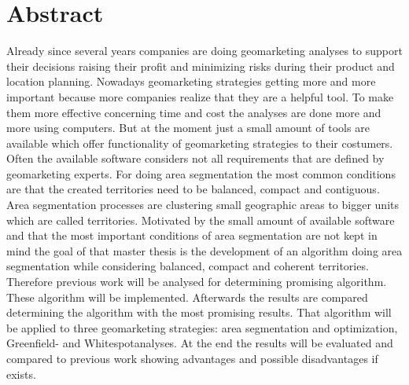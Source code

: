 \section*{Abstract}

Already since several years companies are doing geomarketing analyses to support their decisions raising their profit and minimizing risks during their product and location planning. Nowadays geomarketing strategies getting more and more important because more companies realize that they are a helpful tool. To make them more effective concerning time and cost the analyses are done more and more using computers. But at the moment just a small amount of tools are available which offer functionality of geomarketing strategies to their costumers. Often the available software considers not all requirements that are defined by geomarketing experts. For doing area segmentation the most common conditions are that the created territories need to be balanced, compact and contiguous. Area segmentation processes are clustering small geographic areas to bigger units which are called territories. Motivated by the small amount of available software and that the most important conditions of area segmentation are not kept in mind the goal of that master thesis is the development of an algorithm doing area segmentation while considering balanced, compact and coherent territories. Therefore previous work will be analysed for determining promising algorithm. These algorithm will be implemented. Afterwards the results are compared determining the algorithm with the most promising results. That algorithm will be applied to three geomarketing strategies: area segmentation and optimization, Greenfield- and Whitespotanalyses. At the end the results will be evaluated and compared to previous work showing advantages and possible disadvantages if exists. 